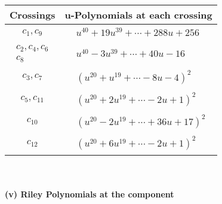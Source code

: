 \documentclass[1p]{elsarticle_modified}
\theoremstyle{definition}
\begin{document}
\begin{tabular}{m{50pt}|m{274pt}}
Crossings & \hspace{64pt}u-Polynomials at each crossing \\
\hline $$\begin{aligned}c_{1},c_{9}\end{aligned}$$&$\begin{aligned}
&u^{40}+19 u^{39}+\cdots+288 u+256
\end{aligned}$\\
\hline $$\begin{aligned}c_{2},c_{4},c_{6}\\c_{8}\end{aligned}$$&$\begin{aligned}
&u^{40}-3 u^{39}+\cdots+40 u-16
\end{aligned}$\\
\hline $$\begin{aligned}c_{3},c_{7}\end{aligned}$$&$\begin{aligned}
&(u^{20}+u^{19}+\cdots-8 u-4)^{2}
\end{aligned}$\\
\hline $$\begin{aligned}c_{5},c_{11}\end{aligned}$$&$\begin{aligned}
&(u^{20}+2 u^{19}+\cdots-2 u+1)^{2}
\end{aligned}$\\
\hline $$\begin{aligned}c_{10}\end{aligned}$$&$\begin{aligned}
&(u^{20}-2 u^{19}+\cdots+36 u+17)^{2}
\end{aligned}$\\
\hline $$\begin{aligned}c_{12}\end{aligned}$$&$\begin{aligned}
&(u^{20}+6 u^{19}+\cdots-2 u+1)^{2}
\end{aligned}$\\
\hline
\end{tabular}\\~\\
\newpage\renewcommand{\arraystretch}{1}
\flushleft \textbf{(v) Riley Polynomials at the component}\newline \\
\end{document}
